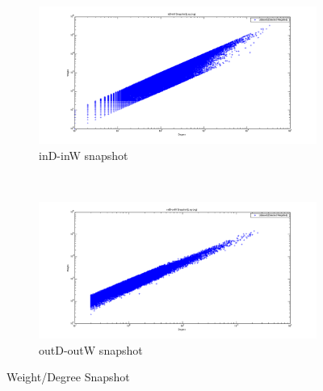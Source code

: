 \begin{figure}
    \centering
    \begin{subfigure}[htbp]{0.8\textwidth}
            \includegraphics[width=\textwidth]{FIG/dw_in.png}
            \caption{inD-inW snapshot}
            \label{fig:dw-out}
    \end{subfigure}
    ~ %
    \begin{subfigure}[htbp]{0.8\textwidth}
            \includegraphics[width=\textwidth]{FIG/dw_out.png}
            \caption{outD-outW snapshot}
            \label{fig:dw-out}
    \end{subfigure}
    \caption{Weight/Degree Snapshot}
        \label{fig:results8-1}
\end{figure}

